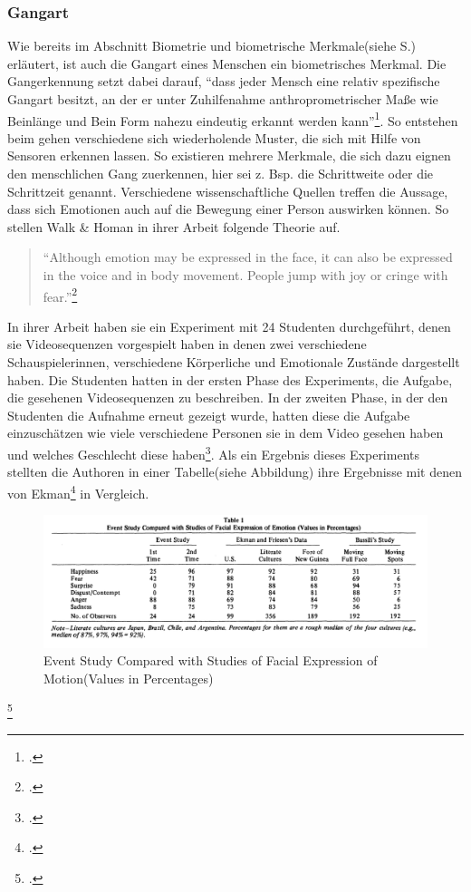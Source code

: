 \subsubsection{Gangart}
Wie bereits im Abschnitt Biometrie und biometrische Merkmale(siehe S.\pageref{section:Biometrie}) erläutert, ist auch die Gangart eines Menschen ein biometrisches Merkmal. Die Gangerkennung setzt dabei darauf, ``dass jeder Mensch eine relativ spezifische Gangart besitzt, an der er unter Zuhilfenahme anthroprometrischer Maße wie Beinlänge und Bein Form nahezu eindeutig erkannt werden kann''\footcite[siehe ][Abschnitt Allgemein Abs.2 Z.2]{Bio18}. So entstehen beim gehen verschiedene sich wiederholende Muster, die sich mit Hilfe von Sensoren erkennen lassen. So existieren mehrere Merkmale, die sich dazu eignen den menschlichen Gang zuerkennen, hier sei z. Bsp. die Schrittweite oder die Schrittzeit genannt.\newline
Verschiedene wissenschaftliche Quellen treffen die Aussage, dass sich Emotionen auch auf die Bewegung einer Person auswirken können. So stellen Walk \& Homan in ihrer Arbeit folgende Theorie auf.
\begin{quote}
	``Although emotion may be expressed in the face, it can also be expressed in the voice and in body movement. People jump with joy or cringe with fear.''\footcite[siehe ][S.437 Z.20-23]{Wal84}
\end{quote}
In ihrer Arbeit haben sie ein Experiment mit 24 Studenten durchgeführt, denen sie Videosequenzen vorgespielt haben in denen zwei verschiedene Schauspielerinnen, verschiedene Körperliche und Emotionale Zustände dargestellt haben. Die Studenten hatten in der ersten Phase des Experiments, die Aufgabe, die gesehenen Videosequenzen zu beschreiben. In der zweiten Phase, in der den Studenten die Aufnahme erneut gezeigt wurde, hatten diese die Aufgabe einzuschätzen wie viele verschiedene Personen sie in dem Video gesehen haben und welches Geschlecht diese haben\footcite[Vgl. ][S.437+438 Method]{Wal84}. Als ein Ergebnis dieses Experiments stellten die Authoren in einer Tabelle(siehe Abbildung) ihre Ergebnisse mit denen von Ekman\footcite{Ekm92} in Vergleich. 
\begin{figure}[h]
	\centering
	\includegraphics[width=16cm]{Bilder/Gangerkennung-Emotion-Vgl.png}
	\caption[Event Study Compared with Studies of Facial Expression of Motion(Values in Percentages)]{Event Study Compared with Studies of Facial Expression of Motion(Values in Percentages)\footnotemark}
\end{figure}\footcitetext[siehe. ][Tabelle 1 S.438]{Wal84}
